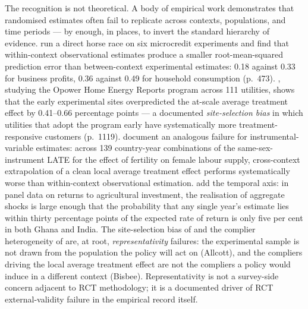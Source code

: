The recognition is not theoretical. A body of empirical work demonstrates that randomised estimates often fail to replicate across contexts, populations, and time periods --- by enough, in places, to invert the standard hierarchy of evidence. \citet{Pritchett2015} run a direct horse race on six microcredit experiments and find that within-context observational estimates produce a smaller root-mean-squared prediction error than between-context experimental estimates: 0.18 against 0.33 for business profits, 0.36 against 0.49 for household consumption (p.~473). \citet{Allcott2015}, studying the Opower Home Energy Reports program across 111 utilities, shows that the early experimental sites overpredicted the at-scale average treatment effect by 0.41--0.66 percentage points --- a documented \emph{site-selection bias} in which utilities that adopt the program early have systematically more treatment-responsive customers (p.~1119). \citet{Bisbee2017} document an analogous failure for instrumental-variable estimates: across 139 country-year combinations of the same-sex-instrument LATE for the effect of fertility on female labour supply, cross-context extrapolation of a clean local average treatment effect performs systematically worse than within-context observational estimation. \citet{Rosenzweig2019} add the temporal axis: in panel data on returns to agricultural investment, the realisation of aggregate shocks is large enough that the probability that any single year's estimate lies within thirty percentage points of the expected rate of return is only five per cent in both Ghana and India. The site-selection bias of \citet{Allcott2015} and the complier heterogeneity of \citet{Bisbee2017} are, at root, \emph{representativity} failures: the experimental sample is not drawn from the population the policy will act on (Allcott), and the compliers driving the local average treatment effect are not the compliers a policy would induce in a different context (Bisbee). Representativity is not a survey-side concern adjacent to RCT methodology; it is a documented driver of RCT external-validity failure in the empirical record itself.

